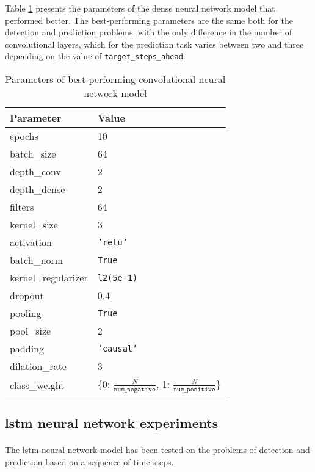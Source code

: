 Table \ref{tab:conv_param} presents the parameters of the dense neural network model that performed better. The best-performing parameters are the same both for the detection and prediction problems, with the only difference in the number of convolutional layers, which for the prediction task varies between two and three depending on the value of \texttt{target\_steps\_ahead}.
\begin{table}[htbp]
    \centering
    \begin{tabular}{ll}
        \hline
        \textbf{Parameter}  & \textbf{Value} \\\hline
        epochs              & 10 \\
        batch\_size         & 64 \\
        depth\_conv         & 2 \\
        depth\_dense        & 2 \\
        filters             & 64 \\
        kernel\_size        & 3 \\
        activation          & \texttt{'relu'} \\
        batch\_norm         & \texttt{True} \\
        kernel\_regularizer & \texttt{l2(5e-1)} \\
        dropout             & 0.4 \\
        pooling             & \texttt{True} \\
        pool\_size          & 2 \\
        padding             & \texttt{'causal'} \\
        dilation\_rate      & 3 \\
        class\_weight       & \{0: $\frac{N}{\texttt{num\_negative}}$, 1: $\frac{N}{\texttt{num\_positive}}$\}
    \end{tabular}
    \caption{Parameters of best-performing convolutional neural network model}
    \label{tab:conv_param}
\end{table}

\subsection{\acs{lstm} neural network experiments}
\paragraph{} The \acs{lstm} neural network model has been tested on the problems of detection and prediction based on a sequence of time steps.

